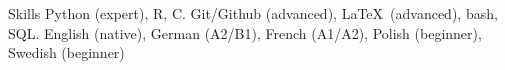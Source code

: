 
\begin{rubric}{Skills}
	Python (expert), R, C.
	Git/Github (advanced), \LaTeX~(advanced), bash, SQL.
    English (native), German (A2/B1), French (A1/A2), Polish (beginner), Swedish (beginner)
\end{rubric}

